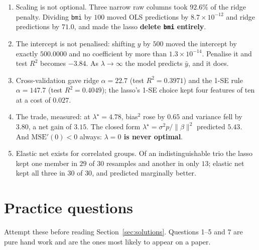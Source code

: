 \documentclass[11pt]{article}
\begin{document}
\begin{enumerate}[leftmargin=*]
    $1.5\times10^{-3}$ at $\alpha = 10^{6}$); lasso sweeps delete features in
    a definite order, and half the diabetes features retain $94.5\%$ of the
    training $R^2$.
  \item Scaling is not optional. Three narrow raw columns took $92.6\%$ of the
    ridge penalty. Dividing \texttt{bmi} by $100$ moved OLS predictions by
    $8.7\times10^{-12}$ and ridge predictions by $71.0$, and made the lasso
    \textbf{delete \texttt{bmi} entirely}.
  \item The intercept is not penalised: shifting $y$ by $500$ moved the
    intercept by exactly $500.0000$ and no coefficient by more than
    $1.3\times10^{-14}$. Penalise it and test $R^2$ becomes $-3.84$. As
    $\lambda\to\infty$ the model predicts $\bar y$, and it does.
  \item Cross-validation gave ridge $\alpha = 22.7$ (test $R^2 = 0.3971$) and
    the 1-SE rule $\alpha = 147.7$ (test $R^2 = 0.4049$); the lasso's 1-SE
    choice kept four features of ten at a cost of $0.027$.
  \item The trade, measured: at $\lambda^\star = 4.78$, bias$^2$ rose by
    $0.65$ and variance fell by $3.80$, a net gain of $3.15$. The closed form
    $\lambda^\star = \sigma^2 p/\|\beta\|^2$ predicted $5.43$. And
    $\mathrm{MSE}'(0) < 0$ always: \textbf{$\lambda = 0$ is never optimal}.
  \item Elastic net exists for correlated groups. Of an indistinguishable
    trio the lasso kept one member in $29$ of $30$ resamples and another in
    only $13$; elastic net kept all three in $30$ of $30$, and predicted
    marginally better.
\end{enumerate}

\section{Practice questions}
\label{sec:practice}

Attempt these before reading Section~\ref{sec:solutions}. Questions 1--5 and 7
are pure hand work and are the ones most likely to appear on a paper.
\end{document}
